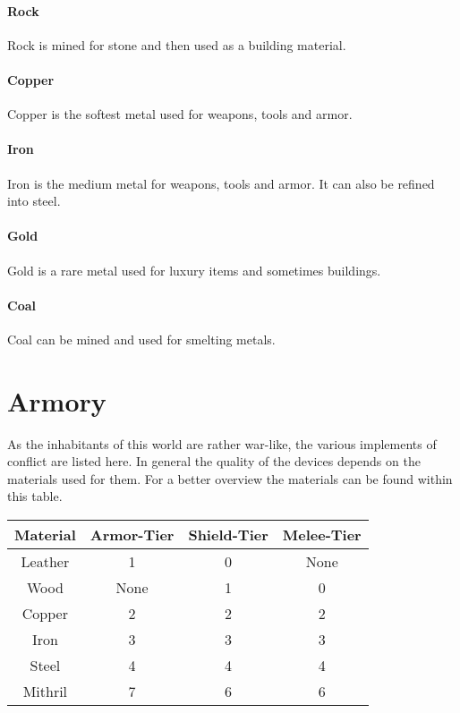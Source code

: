 \paragraph{Rock}
Rock is mined for stone and then used as a building material.

\paragraph{Copper}
Copper is the softest metal used for weapons, tools and armor.

\paragraph{Iron}
Iron is the medium metal for weapons, tools and armor. It can also be refined
into steel.

\paragraph{Gold}
Gold is a rare metal used for luxury items and sometimes buildings.

\paragraph{Coal}
Coal can be mined and used for smelting metals.

\section{Armory}\label{ch:Goods:Armory}
As the inhabitants of this world are rather war-like, the various implements of
conflict are listed here. In general the quality of the devices depends on the
materials used for them. For a better overview the materials can be found
within this table.

\begin{longtable}{cccc}
	\toprule
	Material & Armor-Tier & Shield-Tier & Melee-Tier \\
	\midrule
	Leather  & 1          & 0           & None       \\
	Wood     & None       & 1           & 0          \\
	Copper   & 2          & 2           & 2          \\
	Iron     & 3          & 3           & 3          \\
	Steel    & 4          & 4           & 4          \\
	Mithril  & 7          & 6           & 6          \\
	\bottomrule
\end{longtable}

